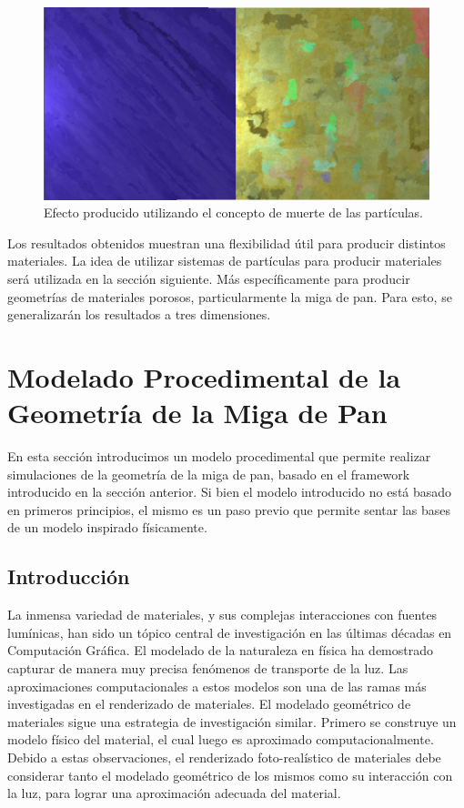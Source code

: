\begin{figure}[t!]
\centering
\includegraphics[scale=0.2]{muerte}
\caption{Efecto producido utilizando el concepto de muerte de las partículas.}
\label{muerte}
\end{figure}

Los resultados obtenidos muestran una flexibilidad útil para producir distintos materiales.
La idea de utilizar sistemas de partículas para producir materiales será utilizada en la sección siguiente.
Más específicamente para producir geometrías de materiales porosos, particularmente la miga de pan.
Para esto, se generalizarán los resultados a tres dimensiones.

\section{Modelado Procedimental de la Geometría de la Miga de Pan}
En esta sección introducimos un modelo procedimental que permite realizar simulaciones de la geometr\'ia de la miga de pan, basado en el framework introducido en la secci\'on anterior.
Si bien el modelo introducido no está basado en primeros principios, el mismo es un paso previo que permite sentar las bases de un modelo inspirado físicamente.

\subsection{Introducción}
La inmensa variedad de materiales, y sus complejas interacciones con fuentes lumínicas, han sido un tópico central de investigación en las últimas décadas en Computación Gráfica.
El modelado de la naturaleza en física ha demostrado capturar de manera muy precisa fenómenos de transporte de la luz.
Las aproximaciones computacionales a estos modelos son una de las ramas más investigadas en el renderizado de materiales.
El modelado geométrico de materiales sigue una estrategia de investigación similar. Primero se construye un modelo físico del material, el cual luego es aproximado computacionalmente.
Debido a estas observaciones, el renderizado foto-realístico de materiales debe considerar tanto el modelado geométrico de los mismos como su interacción con la luz, para lograr una aproximación adecuada del material.

